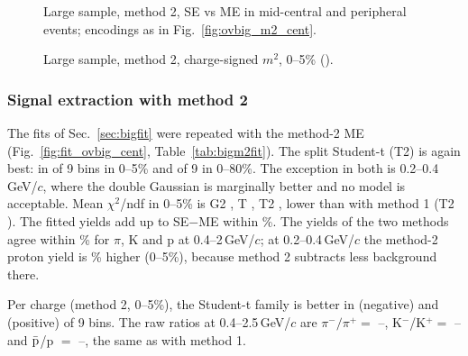 \begin{figure}[H]
\centering
{}
\caption{Large sample, method 2, SE vs ME in mid-central and peripheral events; encodings as in Fig.~\ref{fig:ovbig_m2_cent}.}
\end{figure}



\begin{figure}[H]
\centering
{}
\caption{Large sample, method 2, charge-signed $m^2$, 0--5\% ().}
\end{figure}

\subsubsection{Signal extraction with method 2}
The fits of Sec.~\ref{sec:bigfit} were repeated with the method-2 ME (Fig.~\ref{fig:fit_ovbig_cent}, Table~\ref{tab:bigm2fit}). The
split Student-t (T2) is again best: in \bigTwoFitTtwoBestCi{} of 9 bins in 0--5\% and \bigTwoFitTtwoBestAll{} of 9 in 0--80\%. The
exception in both is 0.2--0.4\,GeV/$c$, where the double Gaussian is marginally better and no model is acceptable. Mean
$\chi^2$/ndf in 0--5\% is G2 \bigTwoFitChiGtwoCi, T \bigTwoFitChiTCi, T2 \bigTwoFitChiTtwoCi, lower than with method 1
(T2 \bigFitChiTtwoCi). The fitted yields add up to SE$-$ME within \bigTwoSumYDev\%. The yields of the two methods agree within
\bigTwoYieldAgree\% for $\pi$, K and p at 0.4--2\,GeV/$c$; at 0.2--0.4\,GeV/$c$ the method-2 proton yield is \bigTwoYieldLowP\% higher
(0--5\%), because method 2 subtracts less background there.


Per charge (method 2, 0--5\%), the Student-t family is better in \bigTwoFitNegTfamCi{} (negative) and \bigTwoFitPosTfamCi{}
(positive) of 9 bins. The raw ratios at 0.4--2.5\,GeV/$c$ are $\pi^-/\pi^+ = $ \bigTwoRatPiMin--\bigTwoRatPiMax,
K$^-$/K$^+ = $ \bigTwoRatKMin--\bigTwoRatKMax{} and $\bar{\rm p}$/p $=$ \bigTwoRatPMin--\bigTwoRatPMax, the same as with method 1.

